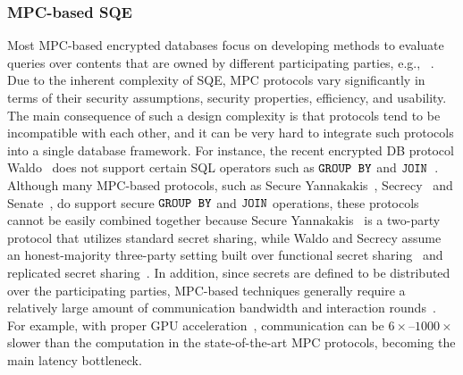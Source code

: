 \subsubsection{MPC-based SQE}
Most MPC-based encrypted databases focus on developing
methods to evaluate queries over contents that are owned by different participating
parties, e.g., ~\cite{bater2016smcql, ishai2016private, 
fuller2017sok, corrigan2017prio, volgushev2019conclave, 
demertzis2020seal, incshrink, liagouris2021secrecy, poddar2021senate, wang2021secure, waldo}. 
Due to the inherent complexity of SQE,  MPC protocols vary significantly in terms of 
their  security assumptions, 
security properties, efficiency, and usability. The main consequence of such a design 
complexity is that protocols tend to be incompatible with each other, and it can be 
very hard to integrate such protocols into a single database framework. 
For instance, the recent encrypted DB protocol Waldo~\cite{waldo} does
not support certain SQL 
operators such as $\texttt{GROUP BY}$ and $\texttt{JOIN}$~\cite{waldo}. 
Although many MPC-based protocols, such as Secure 
Yannakakis~\cite{wang2021secure}, Secrecy~\cite{liagouris2021secrecy} and 
Senate~\cite{poddar2021senate}, do support secure $\texttt{GROUP BY}$ and $\texttt{JOIN}$ operations, 
these protocols cannot be easily combined together because 
Secure Yannakakis~\cite{wang2021secure} is a two-party protocol that utilizes standard
secret sharing, while Waldo and Secrecy assume an honest-majority three-party setting built over
functional secret sharing~\cite{boyle2021function} and replicated secret 
sharing~\cite{araki2017optimized}.
In addition, since secrets are defined to be
distributed over the participating parties, MPC-based techniques generally
require a relatively large amount of communication bandwidth and interaction 
rounds~\cite{waldo}. For example, with proper GPU acceleration~\cite{watson2022piranha}, 
communication can be $6\times$--$1000\times$ slower than the computation in 
the state-of-the-art MPC protocols,
becoming the main latency bottleneck.

